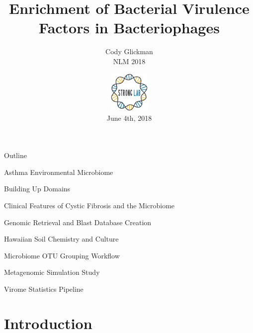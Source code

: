 \documentclass[11pt]{beamer}
\author{Cody Glickman \\ NLM 2018}
\title{Enrichment of Bacterial Virulence Factors in Bacteriophages}
\date{ \includegraphics[height=2cm, width=2cm]{lablogo.png} \\ June 4th, 2018}
\begin{document}
	\maketitle
	\begin{frame}{Outline}
	\begin{block}{Asthma Environmental Microbiome}
	\end{block}
	\vspace{-0.5cm}
	\begin{block}{\alert{Building Up Domains}}
	\end{block}
	\vspace{-0.5cm}
	\begin{block}{Clinical Features of Cystic Fibrosis and the Microbiome}
	\end{block}
	\vspace{-0.5cm}
	\begin{block}{\alert{Genomic Retrieval and Blast Database Creation}}
	\end{block}
	\vspace{-0.5cm}
	\begin{block}{Hawaiian Soil Chemistry and Culture}
	\end{block}
	\vspace{-0.5cm}
	\begin{block}{Microbiome OTU Grouping Workflow}
	\end{block}
	\vspace{-0.5cm}
	\begin{block}{\alert{Metagenomic Simulation Study}}
	\end{block}
	\vspace{-0.5cm}
	\begin{block}{Virome Statistics Pipeline}
	\end{block}
	\end{frame}
	
	
\section{Introduction}
\subsection{}
\end{document}
